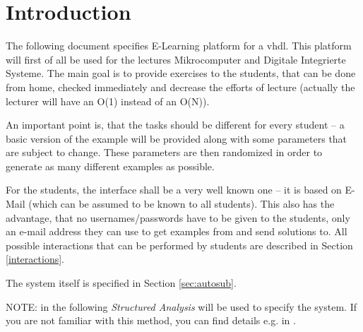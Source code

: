 \section{Introduction}

The following document specifies E-Learning platform for a \gls{vhdl}. This platform will first of all be used for the lectures Mikrocomputer and Digitale Integrierte Systeme. The main goal is to provide exercises to 
the students, that can be done from home, checked immediately and decrease the efforts of lecture (actually the lecturer will have an O(1) instead of an O(N)).

An important point is, that the tasks should be different for every student -- a basic version of the
example will be provided along with some parameters that are subject to change. These parameters are
then randomized in order to generate as many different examples as possible.

For the students, the interface shall be a very well known one -- it is based on E-Mail (which can be
assumed to be known to all students). This also has the advantage, that no usernames/passwords have to
be given to the students, only an e-mail address they can use to get examples from and send solutions to.
All possible interactions that can be performed by students are described in Section \ref{interactions}.

The system itself is specified in Section \ref{sec:autosub}.

NOTE: in the following {\it Structured Analysis} will be used to specify the system. If you are not familiar with this method, you can find details e.g. in \cite{demarco, gooma, cooling}.
